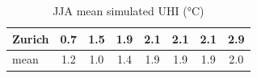 \begin{table}[t]
\begin{tabular}{lccc ccc c}
Zurich & \cellcolor[RGB]{254,219,124}0.7 & \cellcolor[RGB]{252,138,59}1.5 & \cellcolor[RGB]{249,73,40}1.9 & \cellcolor[RGB]{234,41,32}2.1 & \cellcolor[RGB]{234,41,32}2.1 & \cellcolor[RGB]{234,41,32}2.1 & \cellcolor[RGB]{150,0,38}2.9 \\
\midrule
mean & \cellcolor[RGB]{253,169,72}1.2 & \cellcolor[RGB]{254,188,87}1.0 & \cellcolor[RGB]{253,150,64}1.4 & \cellcolor[RGB]{248,70,39}1.9 & \cellcolor[RGB]{248,70,39}1.9 & \cellcolor[RGB]{248,70,39}1.9 & \cellcolor[RGB]{243,60,37}2.0 \\
\bottomrule
\end{tabular}
\caption{JJA mean simulated UHI (°C)}
\label{tab:sim}
\end{table}